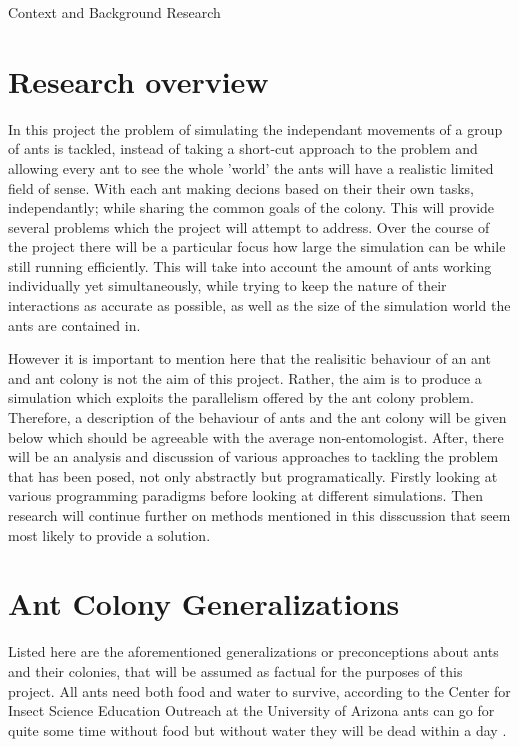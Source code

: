 \documentclass[main.tex]{subfiles}
\begin{document}
Context and Background Research

\section{Research overview} %
In this project the problem of simulating the independant movements of a group of ants is tackled, instead of taking a short-cut approach to the problem and allowing every ant to see the whole 'world' the ants will have a realistic limited field of sense. With each ant making decions based on their their own tasks, independantly; while sharing the common goals of the colony. This will provide several problems which the project will attempt to address. Over the course of the project there will be a particular focus how large the simulation can be while still running efficiently. This will take into account the amount of ants working individually yet simultaneously, while trying to keep the nature of their interactions as accurate as possible, as well as the size of the simulation world the ants are contained in.

However it is important to mention here that the realisitic behaviour of an ant and ant colony is not the aim of this project. Rather, the aim is to produce a simulation which exploits the parallelism offered by the ant colony problem. Therefore, a description of the behaviour of ants and the ant colony will be given below which should be agreeable with the average non-entomologist. After, there will be an analysis and discussion of various approaches to tackling the problem that has been posed, not only abstractly but programatically. Firstly looking at various programming paradigms before looking at different simulations. Then research will continue further on methods mentioned in this disscussion that seem most likely to provide a solution. 

\section{Ant Colony Generalizations} %
Listed here are the aforementioned generalizations or preconceptions about ants and their colonies, that will be assumed as factual for the purposes of this project. All ants need both food and water to survive, according to the Center for Insect Science Education Outreach at the University of Arizona ants can go for quite some time without food but without water they will be dead within a day \cite{Insect1997}.
\end{document}
